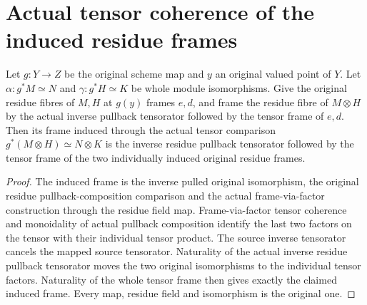 \section{Actual tensor coherence of the induced residue frames}

\begin{lemma}
\label{lem:native-tc-nef-fs-induced-residue-tensor-frame}
\leanok
{}
Let $g:Y\to Z$ be the original scheme map and $y$ an original valued
point of $Y$.  Let $\alpha:g^*M\simeq N$ and $\gamma:g^*H\simeq K$
be whole module isomorphisms.  Give the original residue fibres of $M,H$
at $g(y)$ frames $e,d$, and frame the residue fibre of $M\otimes H$ by
the actual inverse pullback tensorator followed by the tensor frame
of $e,d$.  Then its frame induced through the actual tensor comparison
$g^*(M\otimes H)\simeq N\otimes K$ is the inverse residue pullback
tensorator followed by the tensor frame of the two individually induced
original residue frames.
\end{lemma}
\begin{proof}
The induced frame is the inverse pulled original isomorphism, the
original residue pullback-composition comparison and the actual
frame-via-factor construction through the residue field map.
Frame-via-factor tensor coherence and monoidality of actual pullback
composition identify the last two factors on the tensor with their
individual tensor product.  The source inverse tensorator cancels
the mapped source tensorator.  Naturality of the actual inverse
residue pullback tensorator moves the two original isomorphisms to
the individual tensor factors.  Naturality of the whole tensor
frame then gives exactly the claimed induced frame.  Every map,
residue field and isomorphism is the original one.
\end{proof}

